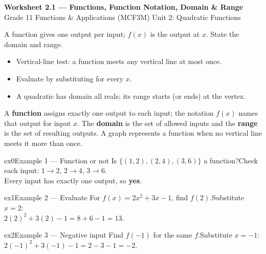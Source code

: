 \documentclass[11pt]{article}
\begin{document}
\begin{center}
{\LARGE\bfseries\color{titleblue}Worksheet 2.1 --- Functions, Function Notation, Domain \& Range}\\[2pt]
{\small Grade 11 Functions \& Applications (MCF3M) \textperiodcentered{} Unit 2: Quadratic Functions}
\end{center}

\begin{ideabox}
A function gives one output per input; $f(x)$ is the output at $x$. State the domain and range.
\begin{itemize}[leftmargin=*,itemsep=2pt]
  \item Vertical-line test: a function meets any vertical line at most once.
  \item Evaluate by substituting for every $x$.
  \item A quadratic has domain all reals; its range starts (or ends) at the vertex.
\end{itemize}
\end{ideabox}

\begin{learnbox}
A \textbf{function} assigns exactly one output to each input; the notation $f(x)$ names that output for input $x$.
The \textbf{domain} is the set of allowed inputs and the \textbf{range} is the set of resulting outputs.
A graph represents a function when no vertical line meets it more than once.
\end{learnbox}


\begin{example}{ex0}{Example 1 --- Function or not}
Is $\{(1,2),(2,4),(3,6)\}$ a function?\soln Check each input: $1\to2$, $2\to4$, $3\to6$. \\ Every input has exactly one output, so \textbf{yes}.
\end{example}

\begin{example}{ex1}{Example 2 --- Evaluate}
For $f(x)=2x^2+3x-1$, find $f(2)$.\soln Substitute $x=2$: \\ $2(2)^2+3(2)-1=8+6-1=13$.
\end{example}

\begin{example}{ex2}{Example 3 --- Negative input}
Find $f(-1)$ for the same $f$.\soln Substitute $x=-1$: \\ $2(-1)^2+3(-1)-1=2-3-1=-2$.
\end{example}
\end{document}
